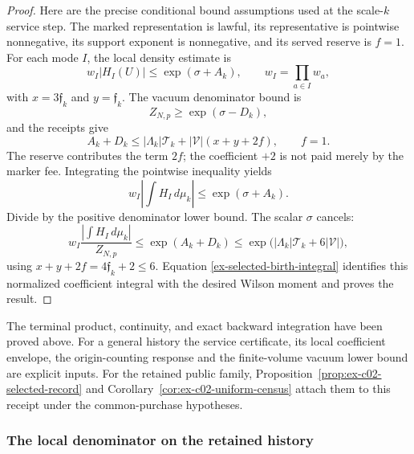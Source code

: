 \begin{proof}
Here are the precise conditional bound assumptions used at the scale-$k$ service step. The marked representation is lawful, its representative is pointwise nonnegative, its support exponent is nonnegative, and its served reserve is $f=1$. For each mode $I$, the local density estimate is
\[
 w_I|H_I(U)|\leq \exp(\sigma+A_k),
 \qquad w_I=\prod_{a\in I}w_a,
\]
with $x=3\mathfrak f_k$ and $y=\mathfrak f_k$. The vacuum denominator bound is
\[
 Z_{N,p}\geq\exp(\sigma-D_k),
\]
and the receipts give
\[
 A_k+D_k\leq |\Lambda_k|\mathcal T_k
            +|\mathcal V|(x+y+2f),\qquad f=1.
\]
The reserve contributes the term $2f$; the coefficient $+2$ is not paid merely by the marker fee. Integrating the pointwise inequality yields
\[
 w_I\left|\int H_I\,d\mu_k\right|
 \leq \exp(\sigma+A_k).
\]
Divide by the positive denominator lower bound. The scalar $\sigma$ cancels:
\[
 w_I\frac{|\int H_I\,d\mu_k|}{Z_{N,p}}
 \leq \exp(A_k+D_k)
 \leq \exp\bigl(|\Lambda_k|\mathcal T_k+6|\mathcal V|\bigr),
\]
using $x+y+2f=4\mathfrak f_k+2\leq6$. Equation \eqref{ex-selected-birth-integral} identifies this normalized coefficient integral with the desired Wilson moment and proves the result.
\end{proof}

The terminal product, continuity, and exact backward integration have been proved above. For a general history the service certificate, its local coefficient
envelope, the origin-counting response and the finite-volume vacuum
lower bound are explicit inputs. For the retained public family,
Proposition~\ref{prop:ex-c02-selected-record} and
Corollary~\ref{cor:ex-c02-uniform-census} attach them to this receipt
under the common-purchase hypotheses.

\subsubsection{The local denominator on the retained history}

